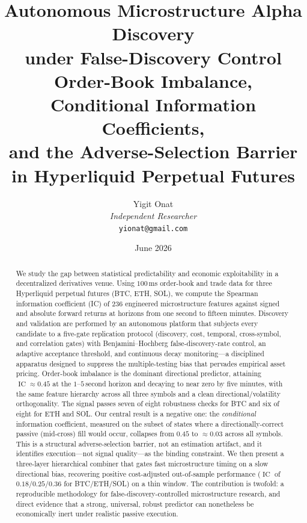 \documentclass[11pt,a4paper]{article}
\theoremstyle{definition}
\theoremstyle{plain}
\DeclareMathOperator{\IC}{IC}
\begin{document}
\title{\textbf{Autonomous Microstructure Alpha Discovery\\[3pt]
under False-Discovery Control}\\[6pt]
\large Order-Book Imbalance, Conditional Information Coefficients,\\
and the Adverse-Selection Barrier in Hyperliquid Perpetual Futures}

\author{Yigit Onat\\
\textit{Independent Researcher}\\
\texttt{yionat@gmail.com}}
\date{June 2026}
\maketitle

\begin{abstract}
We study the gap between statistical predictability and economic exploitability in a
decentralized derivatives venue. Using $100$\,ms order-book and trade data for three
Hyperliquid perpetual futures (BTC, ETH, SOL), we compute the Spearman information
coefficient (IC) of $236$ engineered microstructure features against signed and absolute
forward returns at horizons from one second to fifteen minutes. Discovery and validation are
performed by an autonomous platform that subjects every candidate to a five-gate replication
protocol (discovery, cost, temporal, cross-symbol, and correlation gates) with
Benjamini--Hochberg false-discovery-rate control, an adaptive acceptance threshold, and
continuous decay monitoring---a disciplined apparatus designed to suppress the multiple-testing
bias that pervades empirical asset pricing. Order-book imbalance is the dominant directional
predictor, attaining $\IC\approx 0.45$ at the $1$--$5$\,second horizon and decaying to near zero
by five minutes, with the same feature hierarchy across all three symbols and a clean
directional/volatility orthogonality. The signal passes seven of eight robustness checks for
BTC and six of eight for ETH and SOL. Our central result is a negative one: the
\emph{conditional} information coefficient, measured on the subset of states where a
directionally-correct passive (mid-cross) fill would occur, collapses from $0.45$ to
$\approx 0.03$ across all symbols. This is a structural adverse-selection barrier, not an
estimation artifact, and it identifies execution---not signal quality---as the binding
constraint. We then present a three-layer hierarchical combiner that gates fast microstructure
timing on a slow directional bias, recovering positive cost-adjusted out-of-sample performance
($\IC$ of $0.18$/$0.25$/$0.36$ for BTC/ETH/SOL) on a thin window. The contribution is twofold: a
reproducible methodology for false-discovery-controlled microstructure research, and direct
evidence that a strong, universal, robust predictor can nonetheless be economically inert under
realistic passive execution.
\end{abstract}
\end{document}
